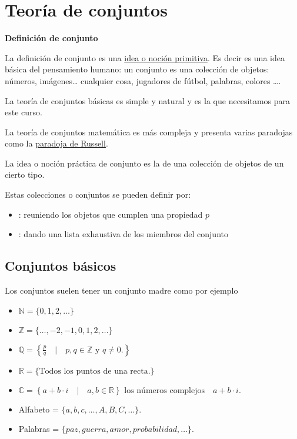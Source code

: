 \documentclass[
  letterpaper,
  DIV=11,
  numbers=noendperiod]{scrreprt}
\providecommand{\tightlist}{%
  \setlength{\itemsep}{0pt}\setlength{\parskip}{0pt}}\usepackage{longtable,booktabs,array}
\begin{document}
\section{Teoría de conjuntos}\label{teoruxeda-de-conjuntos}

\textbf{Definición de conjunto}

La definición de conjunto es una
\href{https://es.wikipedia.org/wiki/Concepto_primitivo}{idea o noción
primitiva}. Es decir es una idea básica del pensamiento humano: un
conjunto es una colección de objetos: números, imágenes\ldots{}
cualquier cosa, jugadores de fútbol, palabras, colores \ldots.

La teoría de conjuntos básicas es simple y natural y es la que
necesitamos para este curso.

La teoría de conjuntos matemática es más compleja y presenta varias
paradojas como la
\href{https://es.wikipedia.org/wiki/Paradoja_de_Russell}{paradoja de
Russell}.

La idea o noción práctica de conjunto es la de una colección de objetos
de un cierto tipo.

Estas colecciones o conjuntos se pueden definir por:

\begin{itemize}
\tightlist
\item
  : reuniendo los objetos que cumplen una propiedad
  \(p\)
\item
  : dando una lista exhaustiva de los miembros del
  conjunto
\end{itemize}

\subsection{Conjuntos básicos}\label{conjuntos-buxe1sicos}

Los conjuntos suelen tener un conjunto madre como por ejemplo

\begin{itemize}
\item
  \(\mathbb{N}=\{0,1,2,\ldots\}\)
\item
  \(\mathbb{Z}=\{\ldots,-2,-1,0,1,2,\ldots\}\)
\item
  \(\mathbb{Q}=\left\{\frac{p}{q}\quad\Big|\quad p,q\in \mathbb{Z} \mbox{ y } q \not= 0.\right\}\)
\item
  \(\mathbb{R}=\{\mbox{Todos los puntos de una recta.}\}\)
\item
  \(\mathbb{C}= \left\{a+b\cdot i\quad \big|\quad a,b\in \mathbb{R}\right\}\mbox{ los números complejos}\quad a+b\cdot i.\)
\item
  Alfabeto = \(\{a,b,c,\ldots, A,B,C,\ldots\}.\)
\item
  Palabras = \(\{paz, guerra, amor, probabilidad,\ldots\}.\)
\end{itemize}
\end{document}
